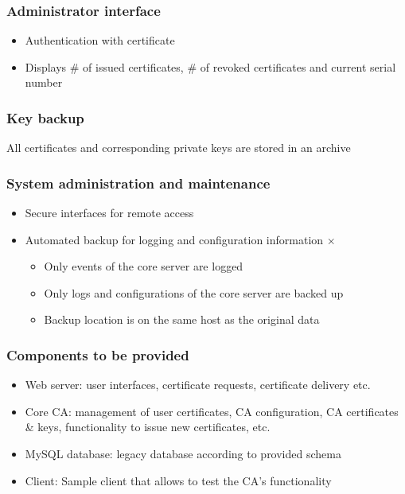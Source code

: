 \documentclass{report}
\begin{document}
\subsubsection{Administrator interface}
\begin{itemize}
\item Authentication with certificate \checkmark
\item Displays \# of issued certificates, \# of revoked certificates and current serial number \checkmark
\end{itemize}
\subsubsection{Key backup}
All certificates and corresponding private keys are stored in an archive \checkmark
\subsubsection{System administration and maintenance}
\begin{itemize}
\item Secure interfaces for remote access \checkmark
\item Automated backup for logging and configuration information $\times$
	\begin{itemize}
	\item Only events of the core server are logged
	\item Only logs and configurations of the core server are backed up
	\item Backup location is on the same host as the original data
	\end{itemize}
\end{itemize}
\subsubsection{Components to be provided}
\begin{itemize}
\item Web server: user interfaces, certificate requests, certificate delivery etc. \checkmark
\item Core CA: management of user certificates, CA configuration, CA certificates \& keys, functionality to issue new certificates, etc. \checkmark
\item MySQL database: legacy database according to provided schema \checkmark
\item Client: Sample client that allows to test the CA's functionality \checkmark
\end{itemize}
\end{document}
